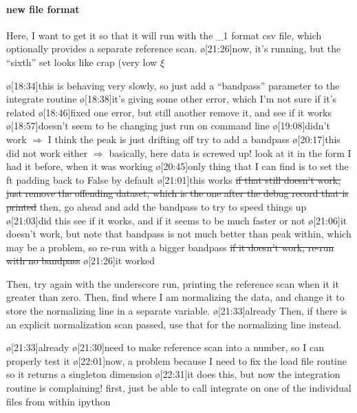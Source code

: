 \paragraph{new file format}
Here, I want to get it so that it will run with the \_1 format csv file, which optionally provides a separate reference scan.
\o[21:26]{now, it's running, but the ``sixth'' set looks like crap (very low $\xi$}
\begin{err}
    \o[18:34]{this is behaving very slowly,} so just add a ``bandpass'' parameter to the integrate routine
    \o[18:38]{it's giving some other error, which I'm not sure if it's related}
    \o[18:46]{fixed one error, but still another}
    remove it, and see if it works
    \o[18:57]{doesn't seem to be changing}
    just run on command line
    \o[19:08]{didn't work $\Rightarrow$ I think the peak is just drifting off}
    try to add a bandpass
    \o[20:17]{this did not work either $\Rightarrow$ basically, here data is screwed up!}
    look at it in the form I had it before, when it was working
    \o[20:45]{only thing that I can find is to}
    set the ft padding back to False by default
    \o[21:01]{this works}
    \sout{ if that still doesn't work, just remove the offending dataset, which is the one after the debug record that is printed }
    then, go ahead and add the bandpass to try to speed things up
    \o[21:03]{did this}
    see if it works, and if it seems to be much faster or not
    \o[21:06]{it doesn't work, but note that bandpass is not much better than peak within, which may be a problem, so re-run with a bigger bandpass}
    \sout{ if it doesn't work, re-run with no bandpass }
    \o[21:26]{it worked}
\end{err}
Then, try again with the underscore run, printing the reference scan when it it greater than zero.
Then, find where I am normalizing the data, and change it to store the normalizing line in a separate variable.
\o[21:33]{already}
Then, if there is an explicit normalization scan passed, use that for the normalizing line instead.
\begin{err}
    \o[21:33]{already}
    \o[21:30]{need to} make reference scan into a number, so I can properly test it
    \o[22:01]{now, a problem because} I need to fix the load file routine so it returns a singleton dimension
    \o[22:31]{it does this, but now the integration routine is complaining!}
    first, just be able to call integrate on one of the individual files from within ipython

\end{err}

